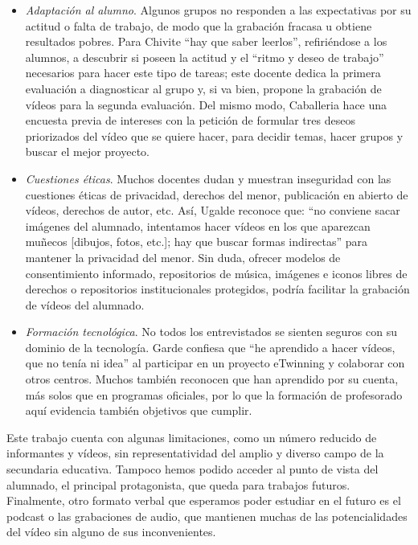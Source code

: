 \documentclass[spanish]{textolivre}
\begin{document}
\begin{itemize}
 \item \textit{Adaptación al alumno}. Algunos grupos no responden a las expectativas por su actitud o falta de trabajo, de modo que la grabación fracasa u obtiene resultados pobres. Para Chivite “hay que saber leerlos”, refiriéndose a los alumnos, a descubrir si poseen la actitud y el “ritmo y deseo de trabajo” necesarios para hacer este tipo de tareas; este docente dedica la primera evaluación a diagnosticar al grupo y, si va bien, propone la grabación de vídeos para la segunda evaluación. Del mismo modo, Caballeria hace una encuesta previa de intereses con la petición de formular tres deseos priorizados del vídeo que se quiere hacer, para decidir temas, hacer grupos y buscar el mejor proyecto.
 \item \textit{Cuestiones éticas}. Muchos docentes dudan y muestran inseguridad con las cuestiones éticas de privacidad, derechos del menor, publicación en abierto de vídeos, derechos de autor, etc. Así, Ugalde reconoce que: “no conviene sacar imágenes del alumnado, intentamos hacer vídeos en los que aparezcan muñecos [dibujos, fotos, etc.]; hay que buscar formas indirectas” para mantener la privacidad del menor. Sin duda, ofrecer modelos de consentimiento informado, repositorios de música, imágenes e iconos libres de derechos o repositorios institucionales protegidos, podría facilitar la grabación de vídeos del alumnado.
 \item \textit{Formación tecnológica}. No todos los entrevistados se sienten seguros con su dominio de la tecnología. Garde confiesa que “he aprendido a hacer vídeos, que no tenía ni idea” al participar en un proyecto eTwinning y colaborar con otros centros. Muchos también reconocen que han aprendido por su cuenta, más solos que en programas oficiales, por lo que la formación de profesorado aquí evidencia también objetivos que cumplir.
\end{itemize}

Este trabajo cuenta con algunas limitaciones, como un número reducido de informantes y vídeos, sin representatividad del amplio y diverso campo de la secundaria educativa. Tampoco hemos podido acceder al punto de vista del alumnado, el principal protagonista, que queda para trabajos futuros. Finalmente, otro formato verbal que esperamos poder estudiar en el futuro es el podcast o las grabaciones de audio, que mantienen muchas de las potencialidades del vídeo sin alguno de sus inconvenientes.
\end{document}
